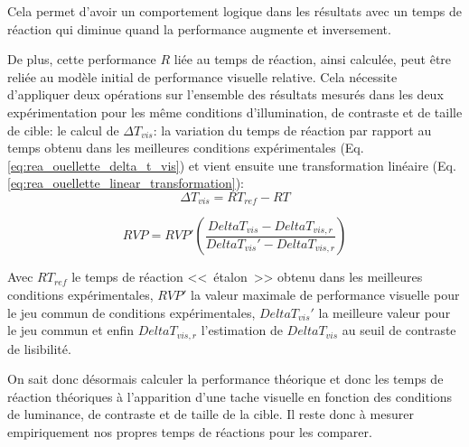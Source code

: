 	\par Cela permet d'avoir un comportement logique dans les résultats avec un temps de réaction qui diminue quand la performance augmente et inversement.
	
	\par De plus, cette performance $R$ liée au temps de réaction, ainsi calculée, peut être reliée au modèle initial de performance visuelle relative. Cela nécessite d'appliquer deux opérations sur l'ensemble des résultats mesurés dans les deux expérimentation pour les même conditions d'illumination, de contraste et de taille de cible: le calcul de $\Delta T_{vis}$: la variation du temps de réaction par rapport au temps obtenu dans les meilleures conditions expérimentales (Eq. \ref{eq:rea_ouellette_delta_t_vis}) et vient ensuite une transformation linéaire (Eq. \ref{eq:rea_ouellette_linear_transformation}):
	\begin{equation}
		\Delta T_{vis} = RT_{ref} - RT
		\label{eq:rea_ouellette_delta_t_vis}
	\end{equation}
	
	\begin{equation}
		RVP = RVP' \left(\frac{Delta T_{vis} - Delta T_{vis,r}}{Delta T_{vis}' - Delta T_{vis,r}}\right)
		\label{eq:rea_ouellette_linear_transformation}
	\end{equation}
	
	\par Avec $RT_{ref}$ le temps de réaction <<~étalon~>> obtenu dans les meilleures conditions expérimentales, $RVP'$ la valeur maximale de performance visuelle pour le jeu commun de conditions expérimentales, $Delta T_{vis}'$ la meilleure valeur pour le jeu commun et enfin $Delta T_{vis,r}$ l'estimation de $Delta T_{vis}$ au seuil de contraste de lisibilité.
	
	\par On sait donc désormais calculer la performance théorique et donc les temps de réaction théoriques à l'apparition d'une tache visuelle en fonction des conditions de luminance, de contraste et de taille de la cible. Il reste donc à mesurer empiriquement nos propres temps de réactions pour les comparer.